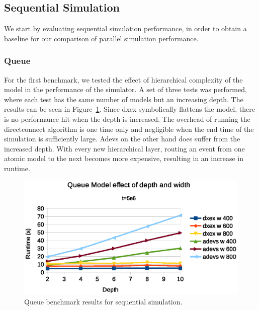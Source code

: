 \subsection{Sequential Simulation}
We start by evaluating sequential simulation performance, in order to obtain a baseline for our comparison of parallel simulation performance.

\subsubsection{Queue}
\label{4-seq-Queue}
For the first benchmark, we tested the effect of hierarchical complexity of the model in the performance of the simulator.
A set of three tests was performed, where each test has the same number of models but an increasing depth.
The results can be seen in Figure~\ref{fig:Queue_benchmark_seq}.
Since dxex symbolically flattens the model, there is no performance hit when the depth is increased.
The overhead of running the directconnect algorithm is one time only and negligible when the end time of the simulation is sufficiently large.
Adevs on the other hand does suffer from the increased depth.
With every new hierarchical layer, routing an event from one atomic model to the next becomes more expensive, resulting in an increase in runtime.
\begin{figure}
	\center
	\includegraphics[width=\columnwidth]{fig/queue_fixed_sequential.eps}
	\caption{Queue benchmark results for sequential simulation.}
	\label{fig:Queue_benchmark_seq}
\end{figure}

